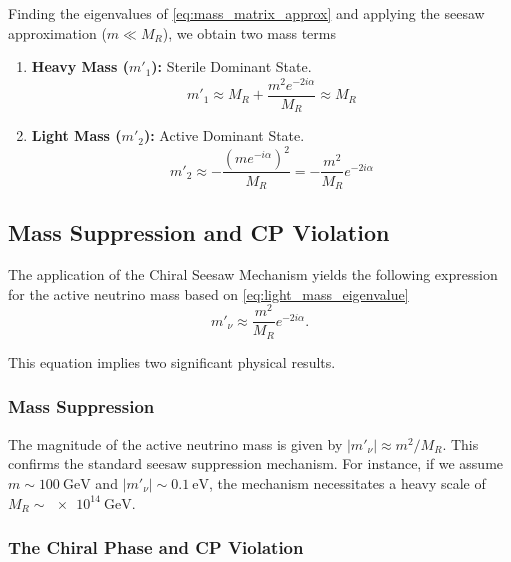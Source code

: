 Finding the eigenvalues of \eqref{eq:mass_matrix_approx} and applying the seesaw
approximation ($m \ll M_R$), we obtain two mass terms
\begin{enumerate}
  \item \textbf{Heavy Mass ($m'_1$):} Sterile Dominant State.
    \begin{equation}
      m'_1 \approx M_R + \frac{m^2 e^{-2i\alpha}}{M_R} \approx M_R
    \end{equation}

  \item \textbf{Light Mass ($m'_2$):} Active Dominant State.
    \begin{equation} \label{eq:light_mass_eigenvalue}
      m'_2 \approx - \frac{\left(m e^{-i\alpha}\right)^2}{M_R} = -
      \frac{m^2}{M_R} e^{-2i\alpha}
    \end{equation}
\end{enumerate}

\subsection{Mass Suppression and CP Violation}

The application of the Chiral Seesaw Mechanism yields the following expression
for the active neutrino mass based on \eqref{eq:light_mass_eigenvalue}
\begin{equation} \label{eq:final_neutrino_mass}
  m'_{\nu} \approx    \frac{m^2}{M_R} e^{-2i\alpha}.
\end{equation}

This equation implies two significant physical results.

\subsubsection{Mass Suppression}

The magnitude of the active neutrino mass is given by $\left|m'_{\nu}\right|
\approx m^2 / M_R$. This confirms the standard seesaw suppression mechanism. For
instance, if we assume $m \sim \qty{100}{\giga\electronvolt}$ and
$\left|m'_{\nu}\right| \sim \qty{0.1}{\electronvolt}$, the mechanism
necessitates a heavy scale of $M_R \sim \qty{e14}{\giga\electronvolt}$.

\subsubsection{The Chiral Phase and CP Violation}

